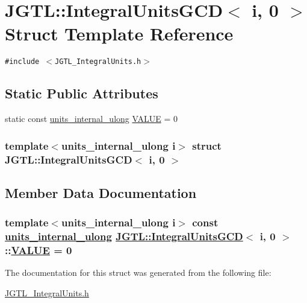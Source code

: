 \hypertarget{struct_j_g_t_l_1_1_integral_units_g_c_d_3_01i_00_010_01_4}{
\section{JGTL::Integral\-Units\-GCD$<$ i, 0 $>$ Struct Template Reference}
\label{struct_j_g_t_l_1_1_integral_units_g_c_d_3_01i_00_010_01_4}
}
{\tt \#include $<$JGTL\_\-Integral\-Units.h$>$}

\subsection*{Static Public Attributes}
\begin{CompactItemize}
\item 
static const \hyperlink{namespace_j_g_t_l_1924d6fd42e2d9661bc0b5a5063b99b3}{units\_\-internal\_\-ulong} \hyperlink{struct_j_g_t_l_1_1_integral_units_g_c_d_3_01i_00_010_01_4_b1d056e6e0e404b0dd34ba67624086cc}{VALUE} = 0
\end{CompactItemize}
\subsubsection*{template$<$units\_\-internal\_\-ulong i$>$ struct JGTL::Integral\-Units\-GCD$<$ i, 0 $>$}



\subsection{Member Data Documentation}
\hypertarget{struct_j_g_t_l_1_1_integral_units_g_c_d_3_01i_00_010_01_4_b1d056e6e0e404b0dd34ba67624086cc}{
\subsubsection[VALUE]{\setlength{\rightskip}{0pt plus 5cm}template$<$units\_\-internal\_\-ulong i$>$ const \hyperlink{namespace_j_g_t_l_1924d6fd42e2d9661bc0b5a5063b99b3}{units\_\-internal\_\-ulong} \hyperlink{struct_j_g_t_l_1_1_integral_units_g_c_d}{JGTL::Integral\-Units\-GCD}$<$ i, 0 $>$::\hyperlink{struct_j_g_t_l_1_1_integral_units_g_c_d_3_01i_00_010_01_4_b1d056e6e0e404b0dd34ba67624086cc}{VALUE} = 0}}
\label{struct_j_g_t_l_1_1_integral_units_g_c_d_3_01i_00_010_01_4_b1d056e6e0e404b0dd34ba67624086cc}




The documentation for this struct was generated from the following file:\begin{CompactItemize}
\item 
\hyperlink{_j_g_t_l___integral_units_8h}{JGTL\_\-Integral\-Units.h}\end{CompactItemize}
